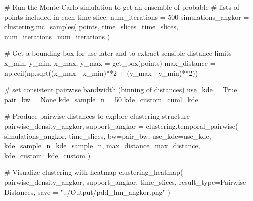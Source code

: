 \documentclass[
  11pt,
  letterpaper,
  DIV=11,
  numbers=noendperiod]{scrartcl}
\newenvironment{Shaded}{\begin{snugshade}}{\end{snugshade}}
\newcommand{\CommentTok}[1]{\textcolor[rgb]{0.37,0.37,0.37}{#1}}
\newcommand{\DecValTok}[1]{\textcolor[rgb]{0.68,0.00,0.00}{#1}}
\newcommand{\NormalTok}[1]{\textcolor[rgb]{0.00,0.23,0.31}{#1}}
\newcommand{\OperatorTok}[1]{\textcolor[rgb]{0.37,0.37,0.37}{#1}}
\newcommand{\StringTok}[1]{\textcolor[rgb]{0.13,0.47,0.30}{#1}}
\newcommand{\VariableTok}[1]{\textcolor[rgb]{0.07,0.07,0.07}{#1}}
\begin{document}
\begin{Shaded}
\begin{Highlighting}[]
\CommentTok{\# Run the Monte Carlo simulation to get an ensemble of probable }
\CommentTok{\# lists of points included in each time slice.}
\NormalTok{num\_iterations }\OperatorTok{=} \DecValTok{500}
\NormalTok{simulations\_angkor }\OperatorTok{=}\NormalTok{ clustering.mc\_samples(}
\NormalTok{    points, }
\NormalTok{    time\_slices}\OperatorTok{=}\NormalTok{time\_slices,  }
\NormalTok{    num\_iterations}\OperatorTok{=}\NormalTok{num\_iterations}
\NormalTok{)}

\CommentTok{\# Get a bounding box for use later and to extract sensible distance limits}
\NormalTok{x\_min, y\_min, x\_max, y\_max }\OperatorTok{=}\NormalTok{ get\_box(points)}
\NormalTok{max\_distance }\OperatorTok{=}\NormalTok{ np.ceil(np.sqrt((x\_max }\OperatorTok{{-}}\NormalTok{ x\_min)}\OperatorTok{**}\DecValTok{2} \OperatorTok{+}\NormalTok{ (y\_max }\OperatorTok{{-}}\NormalTok{ y\_min)}\OperatorTok{**}\DecValTok{2}\NormalTok{))}

\CommentTok{\# set consistent pairwise bandwidth (binning of distances)}
\NormalTok{use\_kde }\OperatorTok{=} \VariableTok{True}
\NormalTok{pair\_bw }\OperatorTok{=} \VariableTok{None}
\NormalTok{kde\_sample\_n }\OperatorTok{=} \DecValTok{50}
\NormalTok{kde\_custom}\OperatorTok{=}\NormalTok{cuml\_kde}

\CommentTok{\# Produce pairwise distances to explore clustering structure}
\NormalTok{pairwise\_density\_angkor, support\_angkor }\OperatorTok{=}\NormalTok{ clustering.temporal\_pairwise(}
\NormalTok{    simulations\_angkor, }
\NormalTok{    time\_slices,}
\NormalTok{    bw}\OperatorTok{=}\NormalTok{pair\_bw, }
\NormalTok{    use\_kde}\OperatorTok{=}\NormalTok{use\_kde, }
\NormalTok{    kde\_sample\_n}\OperatorTok{=}\NormalTok{kde\_sample\_n,}
\NormalTok{    max\_distance}\OperatorTok{=}\NormalTok{max\_distance,}
\NormalTok{    kde\_custom}\OperatorTok{=}\NormalTok{kde\_custom}
\NormalTok{)}

\CommentTok{\# Visualize clustering with heatmap}
\NormalTok{clustering\_heatmap(}
\NormalTok{    pairwise\_density\_angkor,}
\NormalTok{    support\_angkor,}
\NormalTok{    time\_slices,}
\NormalTok{    result\_type}\OperatorTok{=}\StringTok{\textquotesingle{}Pairwise Distances\textquotesingle{}}\NormalTok{,}
\NormalTok{    save }\OperatorTok{=} \StringTok{"../Output/pdd\_hm\_angkor.png"}
\NormalTok{)}
\end{Highlighting}
\end{Shaded}
\end{document}
